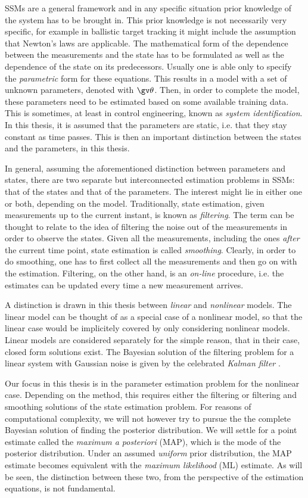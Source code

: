 SSMs are a general framework and in any specific situation prior knowledge of the
system has to be brought in. This prior knowledge is not necessarily very specific,
for example in ballistic target tracking it might include the assumption that Newton's
laws are applicable. The mathematical form of the dependence
between the measurements and the state has to be formulated as well as the dependence
of the state on its predecessors. Usually one is able only to specify the 
\emph{parametric} form for these equations. This results in a model with a set
of unknown parameters, denoted with $\Th$. Then, in order
to complete the model, these parameters need to be estimated based on some available
training data. This is sometimes, at least
in control engineering, known as \emph{system identification}. In this thesis,
it is assumed that the parameters are static, i.e. that they stay constant
as time passes. This is then an important distinction between the states and
the parameters, in this thesis.

In general, assuming the aforementioned distinction between parameters and states, there are two separate but
interconnected estimation problems in SSMs: that of the states and that of the parameters. The interest might
lie in either one or both, depending on the model. Traditionally, state
estimation, given measurements up to the current instant, is known as \emph{filtering}.
The term can be thought to relate to the idea of filtering the noise out of the measurements
in order to observe the states. Given all the measurements, including the ones
\emph{after} the current time point, state estimation is called \emph{smoothing}.
Clearly, in order to do smoothing, one has to first collect all the measurements
and then go on with the estimation. Filtering, on the other hand, is an \emph{on-line}
procedure, i.e. the estimates can be updated every time a new measurement arrives.

A distinction is drawn in this thesis between \emph{linear} and \emph{nonlinear}
models. The linear model can be thought of as a special case of a nonlinear model,
so that the linear case would be implicitely covered by only considering nonlinear models.
Linear models are considered separately for the simple reason, that in their case, closed
form solutions exist. The Bayesian solution of the filtering problem for a linear system
with Gaussian noise is given by the celebrated \emph{Kalman filter} \parencite{Kalman1960}.

Our focus in this thesis is in the parameter estimation problem for the nonlinear case.
Depending on the method, this requires either the filtering or filtering and smoothing
solutions of the state estimation problem. For reasons of computational complexity, we will not however try to pursue
the the complete Bayesian solution of finding the posterior distribution. We will settle
for a point estimate called the \emph{maximum a posteriori} (MAP), which is the mode
of the posterior distribution. Under an assumed \emph{uniform} prior distribution,
the MAP estimate becomes equivalent with the \emph{maximum likelihood} (ML) estimate.
As will be seen, the distinction between these two, from the perspective of the
estimation equations, is not fundamental.

